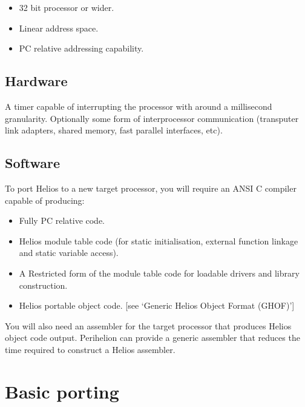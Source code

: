 \begin{itemize}

\item 32 bit processor or wider.

\item Linear address space.

\item PC relative addressing capability.

\end{itemize}

\subsection{Hardware}

A timer capable of interrupting the processor with around a
millisecond granularity.
Optionally some form of interprocessor communication (transputer link adapters,
shared memory, fast parallel interfaces, etc).

\subsection{Software}

To port Helios to a new target processor, you will require an ANSI C compiler
capable of producing:

\begin{itemize}

\item  Fully PC relative code.

\item Helios module table code (for static initialisation, external function
linkage and static variable access).

\item A Restricted form of the module table code for loadable drivers and
library construction.

\item Helios portable object code. [see `Generic Helios Object Format (GHOF)']

\end{itemize}

You will also need an assembler for the target processor that produces
Helios object code output. Perihelion can provide a generic assembler
that reduces the time required to construct a Helios assembler.

\section{Basic porting}

